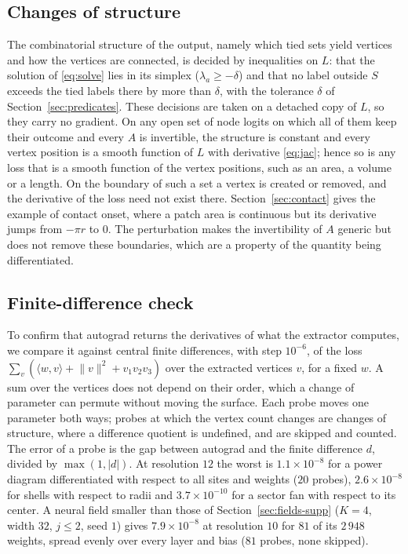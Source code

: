\documentclass[11pt]{article}
\theoremstyle{definition}
\begin{document}
\subsection{Changes of structure}

The combinatorial structure of the output, namely which tied sets yield
vertices and how the vertices are connected, is decided by inequalities on
$L$: that the solution of \eqref{eq:solve} lies in its simplex
($\lambda_a \ge -\delta$) and that no label outside $S$ exceeds the tied
labels there by more than $\delta$, with the tolerance $\delta$ of
Section~\ref{sec:predicates}. These decisions are taken on a detached copy of $L$, so they carry no
gradient. On any open set of node logits on which all of them keep their
outcome and every $A$ is invertible, the structure is constant and every
vertex position is a smooth function of $L$ with derivative \eqref{eq:jac};
hence so
is any loss that is a smooth function of the vertex positions, such as an
area, a volume or a length. On the boundary of such a set a vertex is created
or removed, and the derivative of the loss need not exist there.
Section~\ref{sec:contact} gives the example of contact onset,
where a patch area is continuous but its derivative jumps from $-\pi r$ to
$0$. The perturbation makes the invertibility of $A$ generic but does not
remove these boundaries, which are a property of the quantity being
differentiated.

\subsection{Finite-difference check}

To confirm that autograd returns the derivatives of what the extractor
computes, we compare it against central finite differences, with step
$10^{-6}$, of the loss $\sum_v (\langle w, v\rangle + \lVert v\rVert^2 +
v_1 v_2 v_3)$ over the extracted vertices $v$, for a fixed $w$. A sum over
the vertices does not depend on their order, which a change of parameter can
permute without moving the surface. Each probe moves one parameter both
ways; probes at which the vertex count changes are changes of structure,
where a difference quotient is undefined, and are skipped and counted. The
error of a probe is the gap between autograd and the finite difference $d$,
divided by $\max(1, |d|)$.
At resolution $12$ the worst is $1.1\times10^{-8}$ for a power diagram
differentiated with respect to all sites and weights ($20$ probes),
$2.6\times10^{-8}$ for shells with respect to radii and $3.7\times10^{-10}$ for a
sector fan with respect to its center. A neural field smaller than those of
Section~\ref{sec:fields-supp} ($K=4$, width $32$, $j \le 2$, seed $1$) gives
$7.9\times10^{-8}$ at resolution $10$ for $81$ of its $2\,948$ weights,
spread evenly over every layer and bias ($81$ probes, none skipped).
\end{document}
